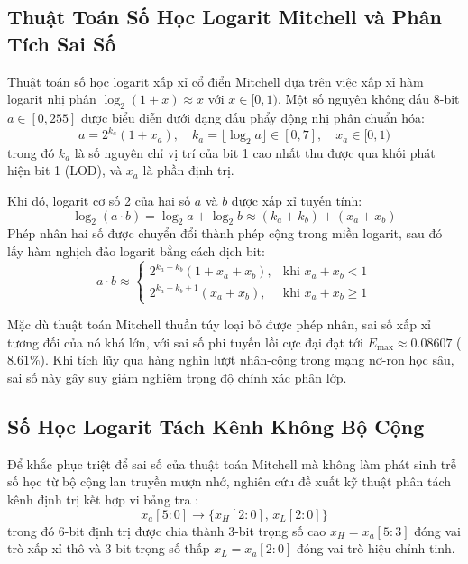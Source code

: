 \documentclass[conference]{IEEEtran}
\begin{document}
\subsection{Thuật Toán Số Học Logarit Mitchell và Phân Tích Sai Số}
\hspace*{1em} Thuật toán số học logarit xấp xỉ cổ điển Mitchell \cite{mitchell1962} dựa trên việc xấp xỉ hàm logarit nhị phân $\log_2(1 + x) \approx x$ với $x \in [0, 1)$. Một số nguyên không dấu 8-bit $a \in [0, 255]$ được biểu diễn dưới dạng dấu phẩy động nhị phân chuẩn hóa:
\begin{equation}
    a = 2^{k_a}(1 + x_a), \quad k_a = \lfloor \log_2 a \rfloor \in [0, 7], \quad x_a \in [0, 1)
    \label{eq:mitchell_decomp}
\end{equation}
trong đó $k_a$ là số nguyên chỉ vị trí của bit 1 cao nhất thu được qua khối phát hiện bit 1 (LOD), và $x_a$ là phần định trị.

Khi đó, logarit cơ số 2 của hai số $a$ và $b$ được xấp xỉ tuyến tính:
\begin{equation}
    \log_2(a \cdot b) = \log_2 a + \log_2 b \approx (k_a + k_b) + (x_a + x_b)
\end{equation}
Phép nhân hai số được chuyển đổi thành phép cộng trong miền logarit, sau đó lấy hàm nghịch đảo logarit bằng cách dịch bit:
\begin{equation}
    a \cdot b \approx 
    \begin{cases}
        2^{k_a + k_b}(1 + x_a + x_b), & \text{khi } x_a + x_b < 1 \\
        2^{k_a + k_b + 1}(x_a + x_b), & \text{khi } x_a + x_b \ge 1
    \end{cases}
\end{equation}

Mặc dù thuật toán Mitchell thuần túy loại bỏ được phép nhân, sai số xấp xỉ tương đối của nó khá lớn, với sai số phi tuyến lồi cực đại đạt tới $E_{\max} \approx 0.08607$ ($8.61\%$). Khi tích lũy qua hàng nghìn lượt nhân-cộng trong mạng nơ-ron học sâu, sai số này gây suy giảm nghiêm trọng độ chính xác phân lớp.

\subsection{Số Học Logarit Tách Kênh Không Bộ Cộng}
\hspace*{1em} Để khắc phục triệt để sai số của thuật toán Mitchell mà không làm phát sinh trễ số học từ bộ cộng lan truyền mượn nhớ, nghiên cứu đề xuất kỹ thuật phân tách kênh định trị kết hợp vi bảng tra \cite{guo2021}:
\begin{equation}
    x_a[5:0] \longrightarrow \{ x_H[2:0],\, x_L[2:0] \}
\end{equation}
trong đó 6-bit định trị được chia thành 3-bit trọng số cao $x_H = x_a[5:3]$ đóng vai trò xấp xỉ thô và 3-bit trọng số thấp $x_L = x_a[2:0]$ đóng vai trò hiệu chỉnh tinh.
\end{document}
